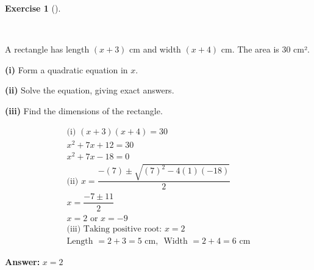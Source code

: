 \documentclass[
  letterpaper,
  DIV=11,
  numbers=noendperiod]{scrreprt}
\theoremstyle{definition}
\newtheorem{exercise}{Exercise}[chapter]
\theoremstyle{remark}
\begin{document}
\begin{exercise}[]\protect\hypertarget{exr-u6-18-2}{}\label{exr-u6-18-2}

~

A rectangle has length \((x + 3)\) cm and width \((x + 4)\) cm. The area
is 30 cm².

\textbf{(i)} Form a quadratic equation in \(x\).

\textbf{(ii)} Solve the equation, giving exact answers.

\textbf{(iii)} Find the dimensions of the rectangle.

\begin{tcolorbox}[enhanced jigsaw, opacitybacktitle=0.6, coltitle=black, arc=.35mm, colframe=quarto-callout-tip-color-frame, colback=white, bottomrule=.15mm, left=2mm, colbacktitle=quarto-callout-tip-color!10!white, titlerule=0mm, opacityback=0, title=\textcolor{quarto-callout-tip-color}{\faLightbulb}\hspace{0.5em}{🔍 View Solution}, leftrule=.75mm, breakable, rightrule=.15mm, bottomtitle=1mm, toptitle=1mm, toprule=.15mm]

\begin{align*}
\text{(i) } (x + 3)(x + 4) = 30 \\ x^2 + 7x + 12 = 30 \\ x^2 +7x - 18 = 0 \\ \text{(ii) } x = \dfrac{-(7) \pm \sqrt{(7)^2 - 4(1)(-18)}}{2} \\ x = \dfrac{-7 \pm 11}{2} \\ x = 2 \text{ or } x = -9 \\ \text{(iii) Taking positive root: } x = 2 \\ \text{Length } = 2 + 3 = 5 \text{ cm, }\text{ Width } = 2 + 4 = 6 \text{ cm}
\end{align*}

\textbf{Answer:} \(x = 2\)

\end{tcolorbox}

\end{exercise}
\end{document}
